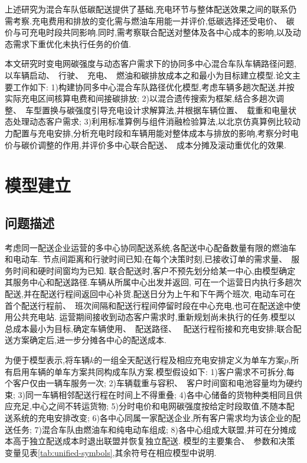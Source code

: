\documentclass{setp-new}
\begin{document}
上述研究为混合车队低碳配送提供了基础,充电环节与整体配送效果之间的联系仍需考察.充电费用和排放的变化需与燃油车用能一并评价,低碳选择还受电价、~碳价与可充电时段共同影响.同时,需考察联合配送对整体及各中心成本的影响,以及动态需求下重优化未执行任务的价值.

本文研究时变电网碳强度与动态客户需求下的协同多中心混合车队车辆路径问题,以车辆启动、~行驶、~充电、~燃油和碳排放成本之和最小为目标建立模型.论文主要工作如下:
1)构建协同多中心混合车队路径优化模型,考虑车辆多趟次配送,并按实际充电区间核算电费和间接碳排放;
2)以混合遗传搜索为框架,结合多趟次调整、~车型置换与碳强度引导充电设计求解算法,并根据车辆位置、~载重和电量状态处理动态客户需求;
3)利用标准算例与组件消融检验算法,以北京仿真算例比较动力配置与充电安排,分析充电时段和车辆用能对整体成本与排放的影响,考察分时电价与碳价调整的作用,并评价多中心联合配送、~成本分摊及滚动重优化的效果.
\section{模型建立}

\subsection{问题描述}

考虑同一配送企业运营的多中心协同配送系统,各配送中心配备数量有限的燃油车和电动车.
节点间距离和行驶时间已知;在每个决策时刻,已接收订单的需求量、~服务时间和硬时间窗均为已知.
联合配送时,客户不预先划分给某一中心,由模型确定其服务中心和配送路径.车辆从所属中心出发并返回,
可在一个运营日内执行多趟次配送,并在配送行程间返回中心补货.配送日分为上午和下午两个班次,
电动车可在首个配送行程前、~班次间隔和配送行程间停留时段在中心充电,也可在配送途中使用公共充电站.
运营期间接收到动态客户需求时,重新规划尚未执行的任务.模型以总成本最小为目标,确定车辆使用、~配送路径、~
配送行程衔接和充电安排;联合配送方案确定后,进一步分摊各中心的配送成本.

为便于模型表示,将车辆$k$的一组全天配送行程及相应充电安排定义为单车方案$p$,所有启用车辆的单车方案共同构成车队方案.模型假设如下: 1)客户需求不可拆分,每个客户仅由一辆车服务一次;
2)车辆载重与容积、~客户时间窗和电池容量均为硬约束;
3)同一车辆相邻配送行程在时间上不得重叠;
4)各中心储备的货物种类相同且供应充足,中心之间不转运货物;
5)分时电价和电网碳强度按给定时段取值,不随本配送系统的充电安排改变;
6)各中心同属一家配送企业,所有客户需求均为该企业的配送任务;
7)混合车队由燃油车和纯电动车组成;
8)各中心组成大联盟,并可在分摊成本高于独立配送成本时退出联盟并恢复独立配送.
模型的主要集合、~参数和决策变量见表\ref{tab:unified-symbols},其余符号在相应模型中说明.
\end{document}
